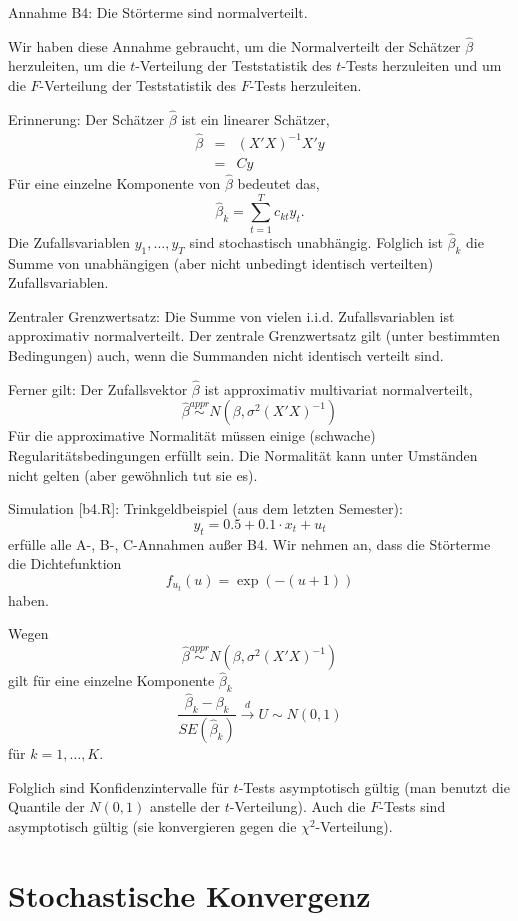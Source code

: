 \documentclass{article}
\begin{document}
Annahme B4: Die Störterme sind normalverteilt.

Wir haben diese Annahme gebraucht, um die Normalverteilt der Schätzer
$\hat\beta$ herzuleiten, um die $t$-Verteilung der Teststatistik
des $t$-Tests herzuleiten und um die $F$-Verteilung der
Teststatistik des $F$-Tests herzuleiten.

Erinnerung: Der Schätzer $\hat{\beta}$ ist ein linearer Schätzer,
\begin{eqnarray*}
	\hat{\beta} &=&(X'X)^{-1}X'y \\
	&=&Cy
\end{eqnarray*}
Für eine einzelne Komponente von $\hat{\beta}$ bedeutet das,
\[ \hat{\beta}_{k}=\sum_{t=1}^{T}c_{kt}y_t. \]
Die Zufallsvariablen $y_{1},\ldots ,y_{T}$ sind stochastisch unabhängig.
Folglich ist $\hat{\beta}_{k}$ die Summe von unabhängigen (aber nicht
unbedingt identisch verteilten) Zufallsvariablen.

Zentraler Grenzwertsatz: Die Summe von vielen i.i.d. Zufallsvariablen ist
approximativ normalverteilt. Der zentrale Grenzwertsatz gilt (unter
bestimmten Bedingungen) auch, wenn die Summanden nicht identisch
verteilt sind.

Ferner gilt: Der Zufallsvektor $\hat{\beta}$ ist approximativ multivariat
normalverteilt,
\[ \hat{\beta}\overset{appr}{\sim }N\left(\beta,\sigma^2(X'X)^{-1}\right) \]
Für die approximative Normalität müssen einige (schwache) 
Regularitätsbedingungen erfüllt sein. Die Normalität kann unter Umständen
nicht gelten (aber gewöhnlich tut sie es).

Simulation [b4.R]: Trinkgeldbeispiel (aus dem letzten Semester):
\[ y_{t}=0.5+0.1\cdot x_{t}+u_{t} \]
erfülle alle A-, B-, C-Annahmen außer B4.
Wir nehmen an, dass die Störterme die Dichtefunktion
\[ f_{u_{t}}(u) =\exp(-(u+1)) \]
haben.

Wegen
\[ \hat{\beta}\overset{appr}{\sim }N\left(\beta,\sigma^2(X'X)^{-1}\right) \]
gilt für eine einzelne Komponente $\hat{\beta}_{k}$
\[ \frac{\hat{\beta}_{k}-\beta _{k}}{SE(\hat{\beta}_{k})}\overset{d}{\longrightarrow }U\sim N(0,1) \]
für $k=1,\ldots ,K$.

Folglich sind Konfidenzintervalle für $t$-Tests asymptotisch gültig
(man benutzt die Quantile der $N(0,1)$ anstelle der $t$-Verteilung).
Auch die $F$-Tests sind asymptotisch gültig (sie konvergieren gegen die
$\chi^2$-Verteilung).

\section*{Stochastische Konvergenz}
\end{document}

